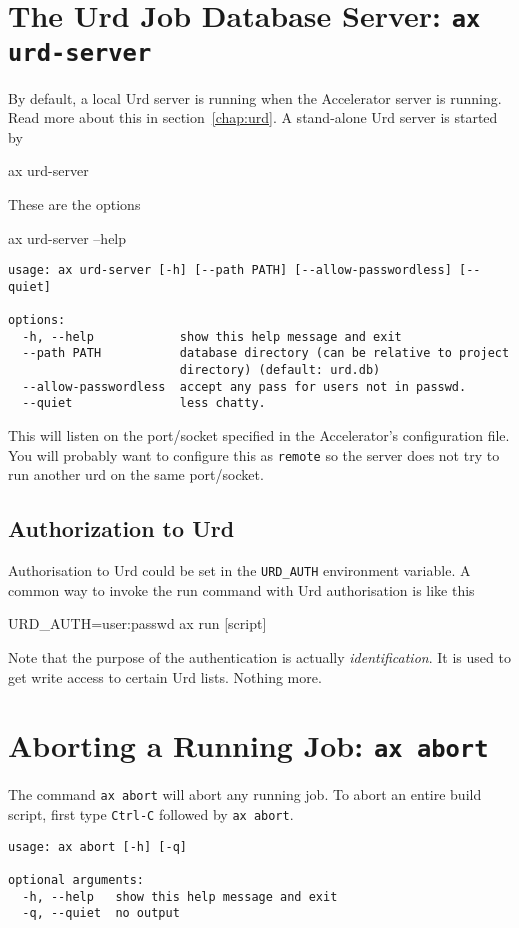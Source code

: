 \section{The Urd Job Database Server: \texttt{ax urd-server}}
By default, a local Urd server is running when the Accelerator server
is running.  Read more about this in section~\ref{chap:urd}.  A
stand-alone Urd server is started by
\begin{shell}
ax urd-server
\end{shell}
These are the options
\begin{shell}
ax urd-server --help
\end{shell}
\begin{snugshade}
\begin{verbatim}
usage: ax urd-server [-h] [--path PATH] [--allow-passwordless] [--quiet]

options:
  -h, --help            show this help message and exit
  --path PATH           database directory (can be relative to project
                        directory) (default: urd.db)
  --allow-passwordless  accept any pass for users not in passwd.
  --quiet               less chatty.
\end{verbatim}
\end{snugshade}
This will listen on the port/socket specified in the Accelerator's
configuration file. You will probably want to configure this as
\texttt{remote} so the server does not try to run another urd on the
same port/socket.


\subsection{Authorization to Urd}
Authorisation to Urd could be set in the \texttt{URD\_AUTH}
environment variable.  A common way to invoke the run command with Urd
authorisation is like this
\begin{shell}
URD_AUTH=user:passwd ax run [script]
\end{shell}
Note that the purpose of the authentication is
actually \textsl{identification}.  It is used to get write access to
certain Urd lists.  Nothing more.


\section{Aborting a Running Job: \texttt{ax abort}}
The command \texttt{ax abort} will abort any running job.  To abort an
entire build script, first type \texttt{Ctrl-C} followed by \texttt{ax
  abort}.
\begin{snugshade}
\begin{verbatim}
usage: ax abort [-h] [-q]

optional arguments:
  -h, --help   show this help message and exit
  -q, --quiet  no output
\end{verbatim}
\end{snugshade}


